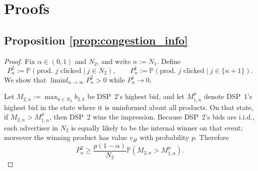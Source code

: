 \section{Proofs}\label{sect:proofs}
\subsection*{Proposition \ref{prop:congestion_info}}
\begin{proof}
Fix $\alpha \in (0,1)$ and $N_2$, and write $n := N_1$. Define
\begin{equation*}
    P_n^{2} := \mathbb{P}(\text{prod.\ } j \text{ clicked} \mid j \in N_2), \qquad
    P_n^{1} := \mathbb{P}(\text{prod.\ } j \text{ clicked} \mid j \in \{n+1\}).
\end{equation*}
We show that $\liminf_{n\to\infty} P_n^{2} > 0$ while $P_n^{1} \to 0$.

\noindent Let $M_{2,n} := \max_{k \in N_2} b_{2,k}$ be DSP~2's highest bid, and let $M_{1,n}^{\mu}$ denote DSP~1's highest bid in the state where it is uninformed about all products. On that state, if $M_{2,n} > M_{1,n}^{\mu}$, then DSP~2 wins the impression. Because DSP~2's bids are i.i.d., each advertiser in $N_2$ is equally likely to be the internal winner on that event; moreover the winning product has value $v_H$ with probability $p$. Therefore
\begin{equation}\label{eq:stay-lower-bound}
    P_n^{2} \geq \frac{p(1-\alpha)}{N_2} \mathbb{P}(M_{2,n} > M_{1,n}^{\mu}).
\end{equation}


\end{proof}
